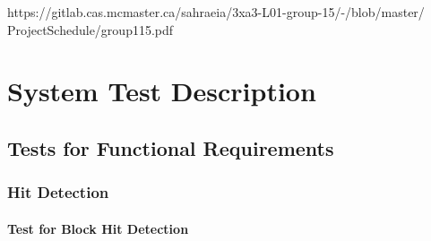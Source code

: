 \documentclass[12pt, titlepage]{article}
\begin{document}
https://gitlab.cas.mcmaster.ca/sahraeia/3xa3-L01-group-15/-/blob/master/\\ProjectSchedule/group115.pdf

\section{System Test Description}
	
\subsection{Tests for Functional Requirements}

\subsubsection{Hit Detection}
		
\paragraph{Test for Block Hit Detection}
\end{document}

